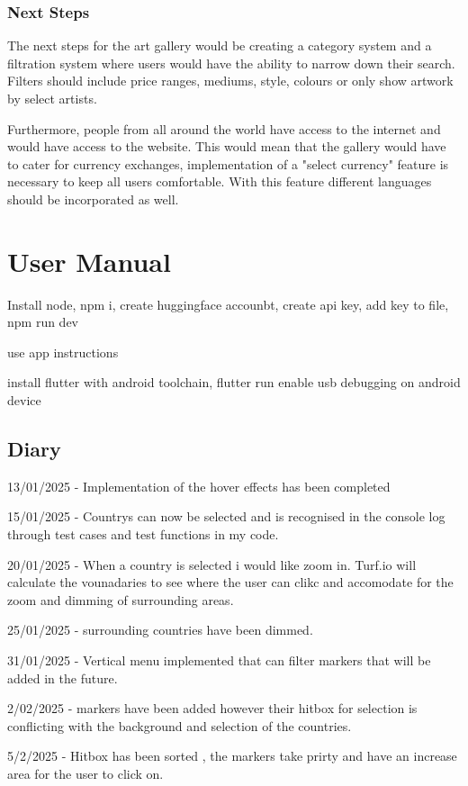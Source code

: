 \documentclass[]{project_final}
\begin{document}
\subsection{Next Steps}
The next steps for the art gallery would be creating a category system and a filtration system where users would have the ability to narrow down their search. Filters should include price ranges, mediums, style, colours or only show artwork by select artists.

Furthermore, people from all around the world have access to the internet and would have access to the website. This would mean that the gallery would have to cater for currency exchanges, implementation of a "select currency" feature is necessary to keep all users comfortable.
With this feature different languages should be incorporated as well.




\chapter{User Manual}
Install node, npm i, create huggingface accounbt, create api key, add key to file, npm run dev

use app instructions

install flutter with android toolchain, flutter run
enable usb debugging on android device
\section{Diary}
13/01/2025 - Implementation of the hover effects has been completed

15/01/2025 - Countrys can now be selected and is recognised in the console log through test cases and test functions in my code.

20/01/2025 - When a country is selected i would like zoom in. Turf.io will calculate the vounadaries to see where the user can clikc and accomodate for the zoom and dimming of surrounding areas.

25/01/2025 - surrounding countries have been dimmed.

31/01/2025 - Vertical menu implemented that can filter markers that will be added in the future.

2/02/2025 - markers have been added however their hitbox for selection is conflicting with the background and selection of the countries.

5/2/2025  - Hitbox has been sorted , the markers take prirty and have an increase area for the user to click on.
\end{document}
